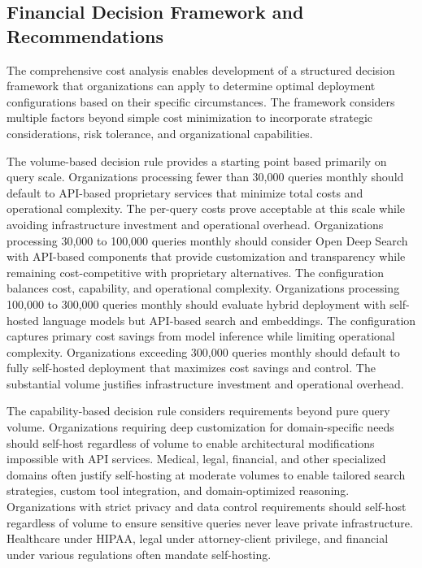 \subsection{Financial Decision Framework and Recommendations}

The comprehensive cost analysis enables development of a structured decision framework that organizations can apply to determine optimal deployment configurations based on their specific circumstances. The framework considers multiple factors beyond simple cost minimization to incorporate strategic considerations, risk tolerance, and organizational capabilities.

The volume-based decision rule provides a starting point based primarily on query scale. Organizations processing fewer than 30,000 queries monthly should default to API-based proprietary services that minimize total costs and operational complexity. The per-query costs prove acceptable at this scale while avoiding infrastructure investment and operational overhead. Organizations processing 30,000 to 100,000 queries monthly should consider Open Deep Search with API-based components that provide customization and transparency while remaining cost-competitive with proprietary alternatives. The configuration balances cost, capability, and operational complexity. Organizations processing 100,000 to 300,000 queries monthly should evaluate hybrid deployment with self-hosted language models but API-based search and embeddings. The configuration captures primary cost savings from model inference while limiting operational complexity. Organizations exceeding 300,000 queries monthly should default to fully self-hosted deployment that maximizes cost savings and control. The substantial volume justifies infrastructure investment and operational overhead.

The capability-based decision rule considers requirements beyond pure query volume. Organizations requiring deep customization for domain-specific needs should self-host regardless of volume to enable architectural modifications impossible with API services. Medical, legal, financial, and other specialized domains often justify self-hosting at moderate volumes to enable tailored search strategies, custom tool integration, and domain-optimized reasoning. Organizations with strict privacy and data control requirements should self-host regardless of volume to ensure sensitive queries never leave private infrastructure. Healthcare under HIPAA, legal under attorney-client privilege, and financial under various regulations often mandate self-hosting.

